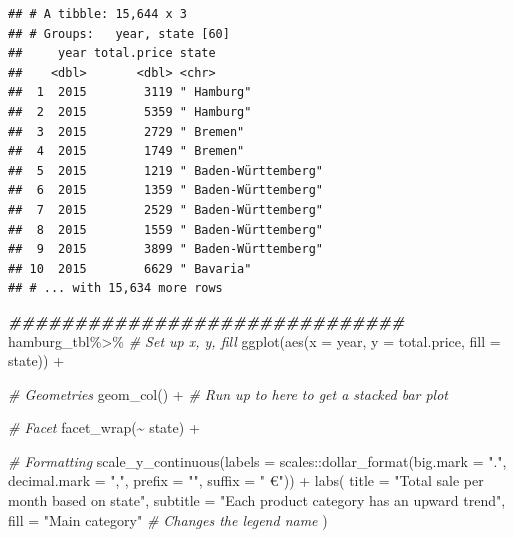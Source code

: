 \documentclass[
]{article}
\newenvironment{Shaded}{\begin{snugshade}}{\end{snugshade}}
\newcommand{\AttributeTok}[1]{\textcolor[rgb]{0.77,0.63,0.00}{#1}}
\newcommand{\CommentTok}[1]{\textcolor[rgb]{0.56,0.35,0.01}{\textit{#1}}}
\newcommand{\DocumentationTok}[1]{\textcolor[rgb]{0.56,0.35,0.01}{\textbf{\textit{#1}}}}
\newcommand{\FunctionTok}[1]{\textcolor[rgb]{0.00,0.00,0.00}{#1}}
\newcommand{\NormalTok}[1]{#1}
\newcommand{\SpecialCharTok}[1]{\textcolor[rgb]{0.00,0.00,0.00}{#1}}
\newcommand{\StringTok}[1]{\textcolor[rgb]{0.31,0.60,0.02}{#1}}
\begin{document}
\begin{verbatim}
## # A tibble: 15,644 x 3
## # Groups:   year, state [60]
##     year total.price state               
##    <dbl>       <dbl> <chr>               
##  1  2015        3119 " Hamburg"          
##  2  2015        5359 " Hamburg"          
##  3  2015        2729 " Bremen"           
##  4  2015        1749 " Bremen"           
##  5  2015        1219 " Baden-Württemberg"
##  6  2015        1359 " Baden-Württemberg"
##  7  2015        2529 " Baden-Württemberg"
##  8  2015        1559 " Baden-Württemberg"
##  9  2015        3899 " Baden-Württemberg"
## 10  2015        6629 " Bavaria"          
## # ... with 15,634 more rows
\end{verbatim}

\begin{Shaded}
\begin{Highlighting}[]
\DocumentationTok{\#\#\#\#\#\#\#\#\#\#\#\#\#\#\#\#\#\#\#\#\#\#\#\#\#\#\#\#\#\#}
\NormalTok{  hamburg\_tbl}\SpecialCharTok{\%\textgreater{}\%}
  \CommentTok{\# Set up x, y, fill}
  \FunctionTok{ggplot}\NormalTok{(}\FunctionTok{aes}\NormalTok{(}\AttributeTok{x =}\NormalTok{ year, }\AttributeTok{y =}\NormalTok{ total.price, }\AttributeTok{fill =}\NormalTok{ state)) }\SpecialCharTok{+}

  \CommentTok{\# Geometries}
  \FunctionTok{geom\_col}\NormalTok{() }\SpecialCharTok{+} \CommentTok{\# Run up to here to get a stacked bar plot}

  \CommentTok{\# Facet}
  \FunctionTok{facet\_wrap}\NormalTok{(}\SpecialCharTok{\textasciitilde{}}\NormalTok{ state) }\SpecialCharTok{+}

  \CommentTok{\# Formatting}
  \FunctionTok{scale\_y\_continuous}\NormalTok{(}\AttributeTok{labels =}\NormalTok{ scales}\SpecialCharTok{::}\FunctionTok{dollar\_format}\NormalTok{(}\AttributeTok{big.mark =} \StringTok{"."}\NormalTok{, }
                                                    \AttributeTok{decimal.mark =} \StringTok{","}\NormalTok{, }
                                                    \AttributeTok{prefix =} \StringTok{""}\NormalTok{, }
                                                    \AttributeTok{suffix =} \StringTok{" €"}\NormalTok{)) }\SpecialCharTok{+}
  \FunctionTok{labs}\NormalTok{(}
    \AttributeTok{title =} \StringTok{"Total sale per month based on state"}\NormalTok{,}
    \AttributeTok{subtitle =} \StringTok{"Each product category has an upward trend"}\NormalTok{,}
    \AttributeTok{fill =} \StringTok{"Main category"} \CommentTok{\# Changes the legend name}
\NormalTok{  )}
\end{Highlighting}
\end{Shaded}
\end{document}
